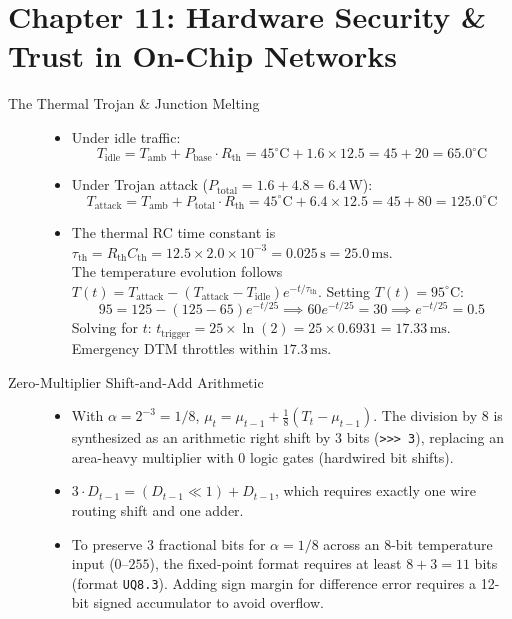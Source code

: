 \section*{Chapter 11: Hardware Security \& Trust in On-Chip Networks}

\begin{description}
    \item[The Thermal Trojan \& Junction Melting]
    \begin{itemize}
        \item Under idle traffic:
        \begin{equation*}
        T_{\mathrm{idle}} = T_{\mathrm{amb}} + P_{\mathrm{base}} \cdot R_{\mathrm{th}} = 45^\circ\mathrm{C} + 1.6 \times 12.5 = 45 + 20 = \mathbf{65.0^\circ\mathrm{C}}
        \end{equation*}
        \item Under Trojan attack ($P_{\mathrm{total}} = 1.6 + 4.8 = 6.4\,\mathrm{W}$):
        \begin{equation*}
        T_{\mathrm{attack}} = T_{\mathrm{amb}} + P_{\mathrm{total}} \cdot R_{\mathrm{th}} = 45^\circ\mathrm{C} + 6.4 \times 12.5 = 45 + 80 = \mathbf{125.0^\circ\mathrm{C}}
        \end{equation*}
        \item The thermal RC time constant is $\tau_{\mathrm{th}} = R_{\mathrm{th}} C_{\mathrm{th}} = 12.5 \times 2.0 \times 10^{-3} = 0.025\,\mathrm{s} = 25.0\,\mathrm{ms}$. \\
        The temperature evolution follows $T(t) = T_{\mathrm{attack}} - (T_{\mathrm{attack}} - T_{\mathrm{idle}}) e^{-t / \tau_{\mathrm{th}}}$. Setting $T(t) = 95^\circ\mathrm{C}$:
        \begin{equation*}
        95 = 125 - (125 - 65) e^{-t / 25} \implies 60 e^{-t / 25} = 30 \implies e^{-t / 25} = 0.5
        \end{equation*}
        Solving for $t$: $t_{\mathrm{trigger}} = 25 \times \ln(2) = 25 \times 0.6931 = \mathbf{17.33\,\mathrm{ms}}$. Emergency DTM throttles within $17.3\,\mathrm{ms}$.
    \end{itemize}

    \item[Zero-Multiplier Shift-and-Add Arithmetic]
    \begin{itemize}
        \item With $\alpha = 2^{-3} = 1/8$, $\mu_t = \mu_{t-1} + \frac{1}{8}(T_t - \mu_{t-1})$. The division by 8 is synthesized as an arithmetic right shift by 3 bits (\texttt{>>> 3}), replacing an area-heavy multiplier with 0 logic gates (hardwired bit shifts).
        \item $3 \cdot D_{t-1} = (D_{t-1} \ll 1) + D_{t-1}$, which requires exactly one wire routing shift and one adder.
        \item To preserve 3 fractional bits for $\alpha = 1/8$ across an 8-bit temperature input ($0\text{--}255$), the fixed-point format requires at least $8 + 3 = 11$ bits (format \texttt{UQ8.3}). Adding sign margin for difference error requires a 12-bit signed accumulator to avoid overflow.
    \end{itemize}


\end{description}

